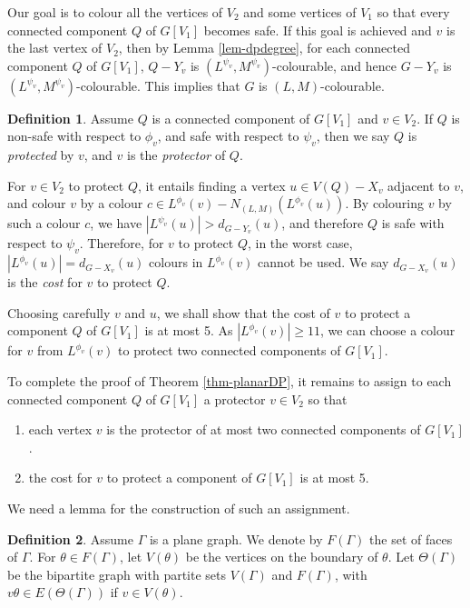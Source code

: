 \documentclass[11pt,a4paper]{article}
\theoremstyle{definition}
\newtheorem{definition}{Definition}
\begin{document}
Our goal is to colour all the vertices of $V_2$ and some vertices of $V_1$ so that  every connected component $Q$ of $G[V_1]$ becomes safe. If 
  this goal is achieved and $v$ is the last vertex of $V_2$, then by Lemma \ref{lem-dpdegree},  for each connected component $Q$ of $G[V_1]$, $Q-Y_v$ is $(L^{\psi_v}, M^{\psi_v})$-colourable, and hence $G-Y_v$ is $(L^{\psi_v}, M^{\psi_v})$-colourable. This implies that $G$ is $(L,M)$-colourable.
 

\begin{definition}
    \label{def-protector}
    Assume $Q$ is a connected component of $G[V_1]$ and $v \in V_2$. If $Q$ is non-safe with respect to $\phi_v$, and safe with respect to $\psi_v$, then we say $Q$ is {\em protected} by $v$, and $v$ is the {\em protector} of $Q$. 
\end{definition}

For $v \in V_2$ to protect $Q$, it entails finding a vertex $u \in V(Q)-X_v$ adjacent to $v$, and colour $v$ by a colour   $c \in L^{\phi_v}(v)-N_{(L,M)}(L^{\phi_v}(u))$. By colouring $v$ by such a colour $c$, we have $|L^{\psi_v}(u)| >   d_{G-Y_v}(u)$, and therefore $Q$ is safe with respect to $\psi_v$. Therefore, for $v$ to protect $Q$, in the worst case, $|L^{\phi_v}(u)| = d_{G-X_v}(u) $ colours in $L^{\phi_v}(v)$ cannot be used. We say $d_{G-X_v}(u)$ is the {\em cost} for $v$ to protect $Q$. 
 
 
 Choosing carefully $v$ and $u$, we shall show that the cost of $v$ to protect a component $Q$ of $G[V_1]$ is at most 5. As   $|L^{\phi_v}(v)| \ge 11$,  we can choose a colour for $v$ from $L^{\phi_v}(v)$ to protect two connected components of $G[V_1]$. 

To complete the proof of Theorem \ref{thm-planarDP}, it 
  remains to assign to each connected component $Q$ of $G[V_1]$ a protector $v \in V_2$ so that 
  \begin{enumerate}
      \item[(D1)] each vertex $v$ is the protector of at most two connected components of $G[V_1]$.
      \item[(D2)] the cost for $v$ to protect a component of $G[V_1]$ is at most 5.
  \end{enumerate}   

 

We need  a lemma for the  construction of such an assignment. 
 
\begin{definition}
    \label{def-thetag}
    Assume $\Gamma$ is a plane graph. We denote by $F(\Gamma)$ the set of faces of $\Gamma$. For $\theta \in F(\Gamma)$, let $V(\theta)$ be the vertices on the boundary of $\theta$. 
Let $\Theta(\Gamma)$ be the bipartite graph with partite sets $V(\Gamma)$ and $F(\Gamma)$, with $v\theta \in E(\Theta(\Gamma))$ if $v \in V(\theta)$. 
\end{definition}
\end{document}
